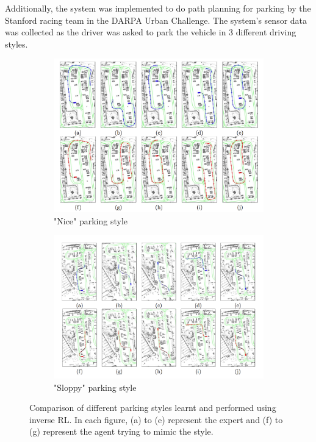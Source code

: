 \documentclass[hidelinks,BTech]{iitmdiss}
\begin{document}
Additionally, the system was implemented to do path planning for parking by the Stanford racing team in the DARPA Urban Challenge\cite{ApprenticeshipDARPA}. The system's sensor data was collected as the driver was asked to park the vehicle in 3 different driving styles.
\begin{figure}[H]
  \centering
  \begin{subfigure}[t]{\textwidth}
    \centering
      \includegraphics[width=\textwidth]{IRL_nice.png}
      \caption{"Nice" parking style}
  \end{subfigure}
  \quad
  \begin{subfigure}[t]{\textwidth}
    \centering
      \includegraphics[width=\textwidth]{IRL_sloppy.png}
      \caption{"Sloppy" parking style}
  \end{subfigure}
  \caption{Comparison of different parking styles learnt and performed using inverse RL. In each figure, (a) to (e) represent the expert and (f) to (g) represent the agent trying to mimic the style.}
\end{figure}
\end{document}
